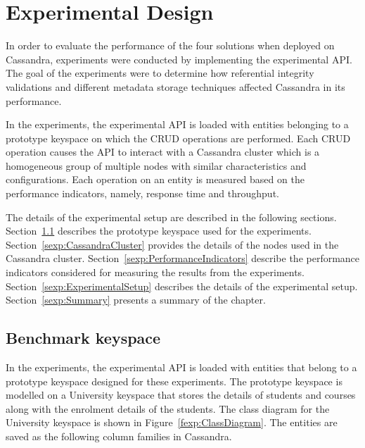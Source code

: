 \chapter{Experimental Design}


In order to evaluate the performance of the four solutions when deployed on
Cassandra,  experiments were conducted by implementing the experimental \ac{API}. 
The goal of the experiments were to determine how referential integrity
validations and different metadata storage techniques affected Cassandra in its
performance. 

 In the experiments,  the experimental \ac{API} is loaded with entities
 belonging to a prototype keyspace  on which the \ac{CRUD} operations are
 performed.  Each \ac{CRUD} operation causes the \ac{API} to interact with a
 Cassandra cluster which is  a homogeneous group of multiple nodes with
 similar characteristics and configurations.  Each operation on an entity  is
 measured based on the performance indicators,  namely,  response time and
 throughput. 

The details of the experimental setup are described in the following sections. 
Section~\ref{sexp:BenchmarkKeyspace} describes the prototype keyspace used for
the experiments.  Section~\ref{sexp:CassandraCluster} provides the details of the
nodes used in the Cassandra cluster.  Section~\ref{sexp:PerformanceIndicators}
describe the performance indicators
 considered for measuring the results from the 
 experiments.  Section~\ref{sexp:ExperimentalSetup}
describes the details of the experimental setup.
Section~\ref{sexp:Summary} presents a summary of the chapter. 


\section{Benchmark keyspace} \label{sexp:BenchmarkKeyspace}
In the experiments,  the experimental \ac{API} is loaded with
entities that belong to a prototype keyspace designed for these experiments. 
The prototype keyspace is modelled on a University keyspace that stores the details
of students and courses along with the enrolment details of the students. The
class diagram for the University keyspace is shown in
Figure~\ref{fexp:ClassDiagram}.  The entities are saved as the following column
families in Cassandra. 


